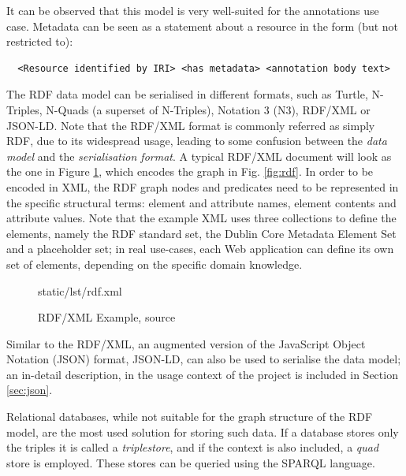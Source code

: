 It can be observed that this model is very well-suited for the annotations use
case. Metadata can be seen as a statement about a resource in the form (but not
restricted to):

\begin{verbatim}
  <Resource identified by IRI> <has metadata> <annotation body text>
\end{verbatim}

The RDF data model can be serialised in different formats, such as Turtle,
N-Triples, N-Quads (a superset of N-Triples), Notation 3 (N3), RDF/XML or
JSON-LD. Note that the RDF/XML format is commonly referred as simply RDF, due
to its widespread usage, leading to some confusion between the \textit{data
  model} and the \textit{serialisation format}. A typical RDF/XML document will
look as the one in Figure \ref{lst:rdf}, which encodes the graph in Fig.
\ref{fig:rdf}. In order to be encoded in XML, the RDF graph nodes and
predicates need to be represented in the specific structural terms: element
and attribute names, element contents and attribute values. Note that the
example XML uses three collections to define the elements, namely the RDF
standard set, the Dublin Core Metadata Element Set \cite{ref:dc} and a
placeholder set; in real use-cases, each Web application can define its own set
of elements, depending on the specific domain knowledge.

\begin{figure}[!ht]
  
    {static/lst/rdf.xml}
    \caption[RDF/XML Example]
            {RDF/XML Example, source \cite{ref:rdfsyntax}}
    \label{lst:rdf}
\end{figure}

Similar to the RDF/XML, an augmented version of the JavaScript Object Notation
(JSON) format, JSON-LD, can also be used to serialise the data model; an
in-detail description, in the usage context of the project is included in
Section \ref{sec:json}.

Relational databases, while not suitable for the graph structure of the RDF
model, are the most used solution for storing such data. If a database stores
only the triples it is called a \textit{triplestore}, and if the context is
also included, a \textit{quad} store is employed. These stores can be queried
using the SPARQL \cite{ref:sparql} language.

